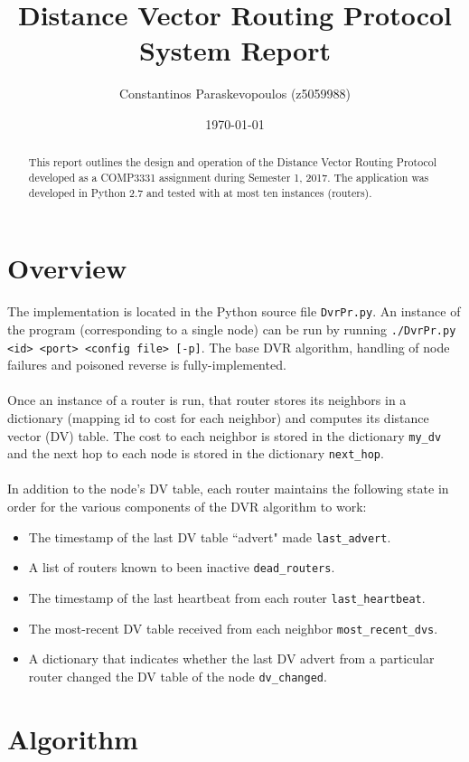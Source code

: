 \documentclass[12pt,a4paper]{article}
\title{Distance Vector Routing Protocol \\ \large System Report}
\author{Constantinos Paraskevopoulos (z5059988)}
\date{\today}
\begin{document}
\maketitle

\begin{abstract}
	This report outlines the design and operation of the Distance Vector Routing Protocol developed as a COMP3331 assignment during Semester 1, 2017. The application was developed in Python 2.7 and tested with at most ten instances (routers).
\end{abstract}

\section{Overview}
\label{sec:overview}

The implementation is located in the Python source file \verb|DvrPr.py|. An instance of the program (corresponding to a single node) can be run by running \verb|./DvrPr.py <id> <port> <config file> [-p]|. The base DVR algorithm, handling of node failures and poisoned reverse is fully-implemented.
\\\\
Once an instance of a router is run, that router stores its neighbors in a dictionary (mapping id to cost for each neighbor) and computes its distance vector (DV) table. The cost to each neighbor is stored in the dictionary \verb|my_dv| and the next hop to each node is stored in the dictionary \verb|next_hop|.
\\\\
In addition to the node's DV table, each router maintains the following state in order for the various components of the DVR algorithm to work:
\begin{itemize}
	\item The timestamp of the last DV table ``advert" made \verb|last_advert|.
	\item A list of routers known to been inactive \verb|dead_routers|.
	\item The timestamp of the last heartbeat from each router \verb|last_heartbeat|.
	\item The most-recent DV table received from each neighbor \verb|most_recent_dvs|.
	\item A dictionary that indicates whether the last DV advert from a particular router changed the DV table of the node \verb|dv_changed|.
\end{itemize}

\section{Algorithm}
\label{sec:algorithm}
\end{document}
